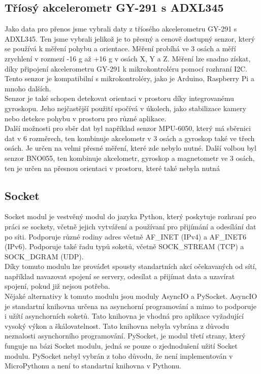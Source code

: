 \documentclass[12pt]{report}			%
\begin{document}
\subsection{Tříosý akcelerometr GY-291 s ADXL345}

Jako data pro přenos jsme vybrali daty z
tříosého akcelerometru GY-291 s ADXL345. Ten jsme vybrali jelikož je to přesný a cenově dostupný senzor, který se používá k měření  pohybu a orientace. Měření probíhá ve 3 osách a měří zrychlení v rozmezí -16 g až +16 g v osách X, Y a Z. Měření lze snadno získat, díky připojení akcelerometru GY-291 k mikrokontroléru pomocí rozhraní I2C. Tento senzor je kompatibilní s mikrokontroléry, jako je Arduino, Raspberry Pi a mnoho dalších.
\\
Senzor je také schopen detekovat orientaci v prostoru díky integrovanému gyroskopu. Jeho nejčastější použití spočívá v úkolech, jako stabilizace kamery nebo detekce pohybu v prostoru pro různé aplikace.
\\
Další možnosti pro sběr dat byl například senzor MPU-6050, který má sběrnici dat v 6 rozměrech, ten kombinuje akcelometr v 3 osách a gyroskop také ve třech osách. Je určen na velmi přesné měření, které zde nebylo nutné. Další volbou byl senzor BNO055, ten kombinuje akcelometr, gyroskop a magnetometr ve 3 osách, ten je určen na přesnou orientaci v prostoru, které také nebyla nutná

\subsection{Socket}

Socket modul je vestvěný modul do jazyka Python, který poskytuje rozhraní pro práci se sockety, včetně jejich vytváření a používaní pro přijímání a odesílání dat po síti. Podporuje různé rodiny adres včetně AF\_INET (IPv4) a AF\_INET6 (IPv6). Podporuje také řadu typů soketů, včetně SOCK\_STREAM (TCP) a SOCK\_DGRAM (UDP).
\\
Díky tomuto modulu lze prováďet spousty standartních akcí očekavaných od sítí, například navazovat spojení se servery, odesílat a přijímat data a uzavírat spojení, pokud již nejsou potřeba. 
\\
Nějaké alternativy k tomuto modulu jsou moduly AsyncIO a PySocket. AsyncIO je standartní knihovna určena na asynchorní programování a mimo to podporuje i užítí asynchorních soketů. Tato knihovna je vhodná pro aplikace vyžadující vysoký výkon a škálovatelnost. Tato knihovna nebyla vybrána z důvodu neznalosti asynchorního programování. PySocket, je modul třetí strany, který funguje na bázi Socket modulu, jedná se pouze o zjednodušení užití Socket modulu. PySocket nebyl vybrán z toho důvodu, že není implementován v MicroPythonu a není to standartní knihovna v Pythonu. 
\end{document}
